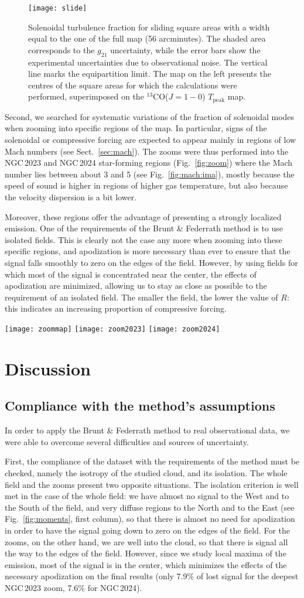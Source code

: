 \documentclass[structabstract]{aa}
\newcommand{\emm}[1]{\ensuremath{#1}}
\newcommand{\emr}[1]{\emm{\mathrm{#1}}}
\newcommand{\FigZoom}{%
  \begin{figure*}
    \centering
    \texttt{[image: zoommap]}
    \texttt{[image: zoom2023]}
    \texttt{[image: zoom2024]}
    \caption{Solenoidal turbulence fraction for zooms on the NGC\,2023 and NGC\,2024 star-forming regions. The shaded area corresponds to the $g_{21}$ uncertainty, while the error bars show the experimental uncertainties due to observational noise. The upper limit of the plots marks the equipartition limit. The map on the left presents the areas for which the calculations were performed (solid squares: NGC\,2024, dashed squares: NGC\,2023), superimposed on the $^{13}$CO($J=1-0$) $T_\emr{peak}$ map.}
    \label{fig:zoom}
  \end{figure*}}
\newcommand{\FigSlide}{%
  \begin{figure}
    \centering
    \texttt{[image: slide]}
    \caption{Solenoidal turbulence fraction for sliding square areas with a width equal to the one of the full map (56 arcminutes). The shaded area corresponds to the $g_{21}$ uncertainty, while the error bars show the experimental uncertainties due to observational noise. The vertical line marks the equipartition limit. The map on the left presents the centres of the square areas for which the calculations were performed, superimposed on the $^{13}$CO($J=1-0$) $T_\emr{peak}$ map.}
    \label{fig:slide}
  \end{figure}}
\begin{document}
\FigSlide{}

Second, we searched for systematic variations of the fraction of solenoidal modes when zooming into specific regions of the map.  In particular, signs of the solenoidal or compressive forcing are expected to appear mainly in regions of low Mach numbers (see Sect.~\ref{sec:mach}). The zooms were thus performed into the NGC\,2023 and NGC\,2024 star-forming regions (Fig.~\ref{fig:zoom})  where the Mach number lies between about 3 and 5 (see Fig.~\ref{fig:mach:ima}), mostly because the speed of sound is higher in regions of higher gas temperature, but also because the velocity dispersion is a bit lower.

Moreover, these regions offer the advantage of presenting a strongly localized emission. One of the requirements of the Brunt \& Federrath method is to use isolated fields. This is clearly not the case any more when zooming into these specific regions, and apodization is more necessary than ever to ensure that the signal falls smoothly to zero on the edges of the field. However, by using fields for which most of the signal is concentrated near the center, the effects of apodization are minimized, allowing us to stay as close as possible to the requirement of an isolated field. The smaller the field, the lower the value of $R$: this indicates an increasing proportion of compressive forcing.

\FigZoom{}


\section{Discussion}
\subsection{Compliance with the method's assumptions}
\label{sec:compliance}
In order to apply the Brunt \& Federrath method to real observational data, we were able to overcome several difficulties and sources of uncertainty.

First, the compliance of the dataset with the requirements of the method must be checked, namely the isotropy of the studied cloud, and its isolation. The whole field and the zooms present two opposite situations. The isolation criterion is well met in the case of the whole field: we have almost no signal to the West and to the South of the field, and very diffuse regions to the North and to the East (see Fig.~\ref{fig:moments}, first column), so that there is almost no need for apodization in order to have the signal going down to zero on the edges of the field. For the zooms, on the other hand, we are well into the cloud, so that there is signal all the way to the edges of the field. However, since we study local maxima of the emission, most of the signal is in the center, which minimizes the effects of the necessary apodization on the final results (only 7.9\% of lost signal for the deepest NGC\,2023 zoom, 7.6\% for NGC\,2024).
\end{document}
